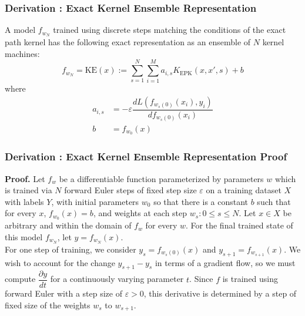\begin{frame}
  \frametitle{Derivation : Exact Kernel Ensemble Representation}
\begin{theorem}%
\label{thm:eker}
A model $f_{w_N}$ trained using discrete steps matching the conditions of the exact path kernel has the following exact representation as an ensemble of $N$ kernel machines:
\begin{equation}
f_{w_N} = \text{KE}(x) :=  \sum_{s = 1}^N \sum_{i = 1}^{M} a_{i,s} K_{\text{EPK}}(x, x', s) + b
\label{ensemble}
\end{equation}
where
\begin{align}
a_{i, s} &= -\varepsilon  \dfrac{d L(f_{w_s(0)}(x_i),  y_i)}{d f_{w_s(0)}(x_i)} \\
b &= f_{w_0}(x)
\end{align}
\end{theorem}
\end{frame}
\begin{frame}
  \frametitle{Derivation : Exact Kernel Ensemble Representation Proof}
\textbf{Proof.} 
\label{proof:eker}
Let $f_{w}$ be a differentiable function parameterized by parameters $w$ which is trained via $N$ forward Euler steps of fixed step size $\varepsilon$ on a training dataset $X$ with labels $ Y$, with initial parameters $w_0$ so that there is a constant $b$ such that for every $x$, $f_{w_0}(x) = b$, and weights at each step ${w_s : 0 \leq s \leq N}$. Let $x \in X$ be arbitrary and within the domain of $f_w$ for every $w$. For the final trained state of this model $f_{w_N}$, let $y = f_{w_N}(x)$. \\

For one step of training, we consider $y_s  = f_{w_s(0)}(x)$ and
$y_{s+1} = f_{w_{s+1}}(x)$. We wish to account for the change $y_{s+1}
- y_s$ in terms of a gradient flow, so we must compute
$\dfrac{\partial y}{dt}$ for a continuously varying parameter
$t$. Since $f$ is trained using forward Euler with a step size of
$\varepsilon > 0$, this derivative is determined by a step of fixed
size of the weights $w_s$ to $w_{s+1}$.
\end{frame}
